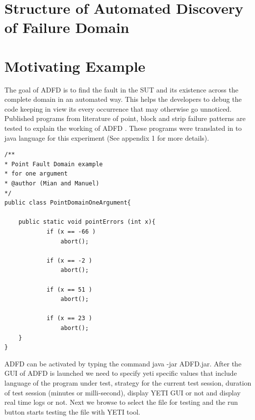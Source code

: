 \documentclass{acm_proc_article-sp}
\begin{document}
\section{Structure of Automated Discovery of Failure Domain}\label{sec:structure}






\section{Motivating Example}\label{sec:example}
The goal of ADFD is to find the fault in the SUT and its existence across the complete domain in an automated way. This helps the developers to debug the code keeping in view its every occurrence that may otherwise go unnoticed.
Published programs from literature \cite{Chen2003}\cite{Chan1996}\cite{Chen2004} of point, block and strip failure patterns are tested to explain the working of ADFD . These programs were translated in to java language for this experiment (See appendix 1 for more details). \\

\begin{lstlisting}
/**
* Point Fault Domain example 
* for one argument
* @author (Mian and Manuel)
*/
public class PointDomainOneArgument{

	public static void pointErrors (int x){
     		if (x == -66 )
       			abort();
     
     		if (x == -2 )
     			abort();
     
     		if (x == 51 )
     			abort();
     
     		if (x == 23 )
     			abort();
	}
}
\end{lstlisting}

ADFD can be activated by typing the command java -jar ADFD.jar. After the GUI of ADFD is launched we need to specify yeti specific values that include language of the program under test, strategy for the current test session, duration of test session (minutes or milli-second), display YETI GUI or not and display real time logs or not. Next we browse to select the file for testing and the run button starts testing the file with YETI tool. 
\end{document}
